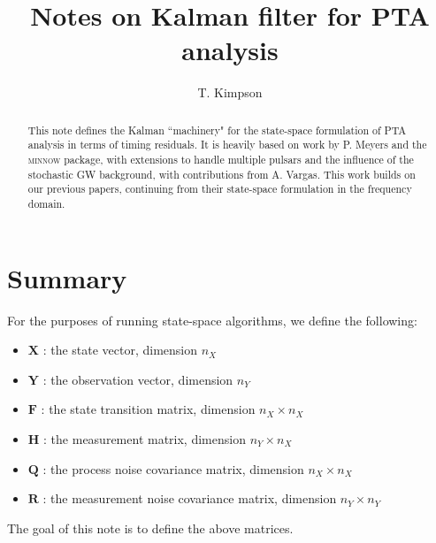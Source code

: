 \documentclass[]{scrartcl}
\title{Notes on Kalman filter for PTA analysis}
\author{T. Kimpson}
\begin{document}
\maketitle
\begin{abstract}
	This note defines the Kalman ``machinery" for the state-space formulation of PTA analysis in terms of timing residuals. It is heavily based on work by P. Meyers and the \textsc{minnow} package, with extensions to handle multiple pulsars and the influence of the stochastic GW background, with contributions from A. Vargas. This work builds on our previous papers, continuing from their state-space formulation in the frequency domain.
\end{abstract}

\section{Summary}

For the purposes of running state-space algorithms, we define the following:

\begin{itemize}
	\item $\boldsymbol{X}$ : the state vector, dimension $n_X$
	\item $\boldsymbol{Y}$ : the observation vector, dimension $n_Y$
	\item $\boldsymbol{F}$ : the state transition matrix, dimension $n_X \times n_X$
	\item $\boldsymbol{H}$ : the measurement matrix, dimension $n_Y \times n_X$
	\item $\boldsymbol{Q}$ : the process noise covariance matrix, dimension $n_X \times n_X$
	\item $\boldsymbol{R}$ : the measurement noise covariance matrix, dimension $n_Y \times n_Y$
\end{itemize}

The goal of this note is to define the above matrices. \newline 
\end{document}
